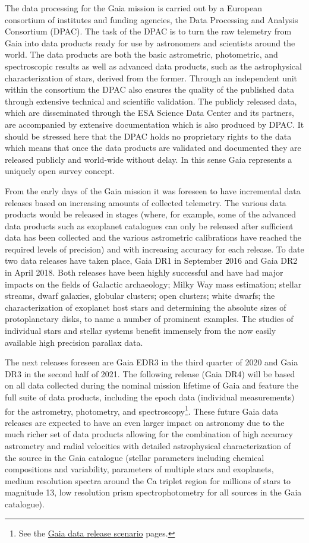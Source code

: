 The data processing for the Gaia mission is carried out by a European consortium of institutes and funding agencies, the Data Processing and Analysis Consortium (DPAC). The task of the DPAC is to turn the raw telemetry from Gaia into data products ready for use by astronomers and scientists around the world. The data products are both the basic astrometric, photometric, and spectroscopic results as well as advanced data products, such as the astrophysical characterization of stars, derived from the former. Through an independent unit within the consortium the DPAC also ensures the quality of the published data through extensive technical and scientific validation. The publicly released data, which are disseminated through the ESA Science Data Center and its partners, are accompanied by extensive documentation which is also produced by DPAC. It should be stressed here that the DPAC holds no proprietary rights to the data which means that once the data products are validated and documented they are released publicly and world-wide without delay. In this sense Gaia represents a uniquely open survey concept.

From the early days of the Gaia mission it was foreseen to have incremental data releases based on increasing amounts of collected telemetry. The various data products would be released in stages (where, for example, some of the advanced data products such as exoplanet catalogues can only be released after sufficient data has been collected and the various astrometric calibrations have reached the required levels of precision) and with increasing accuracy for each release. To date two data releases have taken place, Gaia DR1 in September 2016 and Gaia DR2 in April 2018. Both releases have been highly successful and have had major impacts on the fields of Galactic archaeology; Milky Way mass estimation; stellar streams, dwarf galaxies, globular clusters; open clusters; white dwarfs; the characterization of exoplanet host stars and determining the absolute sizes of protoplanetary disks, to name a number of prominent examples. The studies of individual stars and stellar systems benefit immensely from the now easily available high precision parallax data.

The next releases foreseen are Gaia EDR3 in the third quarter of 2020 and Gaia DR3 in the second half of 2021. The following release (Gaia DR4) will be based on all data collected during the nominal mission lifetime of Gaia and feature the full suite of data products, including the epoch data (individual measurements) for the astrometry, photometry, and spectroscopy\footnote{See the \href{https://www.cosmos.esa.int/web/gaia/release}{Gaia data release scenario} pages.}. These future Gaia data releases are expected to have an even larger impact on astronomy due to the much richer set of data products allowing for the combination of high accuracy astrometry and radial velocities with detailed astrophysical characterization of the source in the Gaia catalogue (stellar parameters including chemical compositions and variability, parameters of multiple stars and exoplanets, medium resolution spectra around the Ca triplet region for millions of stars to magnitude 13, low resolution prism spectrophotometry for all sources in the Gaia catalogue). 


